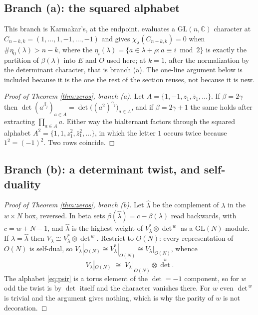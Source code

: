 \documentclass[11pt,reqno]{amsart}
\theoremstyle{plain}
\theoremstyle{definition}
\newcommand{\CC}{\mathbb{C}}
\begin{document}
\subsection{Branch (a): the squared alphabet}\label{sec:brancha}

This branch is Karmakar's, at the endpoint. \cite[Theorem 4.1(A)]{Kar24} evaluates a
$\mathrm{GL}(n,\CC)$ character at $C_{n-k,k}=(1,\dots,1,-1,\dots,-1)$ and gives
$\chi_\lambda(C_{n-k,k})=0$ when $\#\eta_0(\lambda)>n-k$, where the $\eta_i(\lambda)=\{a\in
\lambda+\rho: a\equiv i \bmod 2\}$ is exactly the partition of $\beta(\lambda)$ into $E$ and $O$ used
here; at $k=1$, after the normalization by the determinant character, that is branch (a). The
one-line argument below is included because it is the one the rest of the section reuses, not because
it is new.

\begin{proof}[Proof of Theorem \ref{thm:zeros}, branch {\rm(a)}]
Let $A=\{1,-1,z_1,\bar z_1,\dots\}$. If $\beta=2\gamma$ then
$\det(a^{\beta_j})_{a\in A}=\det\big((a^2)^{\gamma_j}\big)_{a\in A}$, and if $\beta=2\gamma+1$ the
same holds after extracting $\prod_{a\in A}a$. Either way the bialternant factors through the
squared alphabet $A^2=\{1,1,z_1^{2},\bar z_1^{2},\dots\}$, in which the letter $1$ occurs twice
because $1^2=(-1)^2$. Two rows coincide.
\end{proof}

\subsection{Branch (b): a determinant twist, and self-duality}

\begin{proof}[Proof of Theorem \ref{thm:zeros}, branch {\rm(b)}]
Let $\hat\lambda$ be the complement of $\lambda$ in the $w\times N$ box, reversed. In beta sets
$\beta(\hat\lambda)=c-\beta(\lambda)$ read backwards, with $c=w+N-1$, and $\hat\lambda$ is the
highest weight of $V_\lambda^{*}\otimes\det^{\,w}$ as a $\mathrm{GL}(N)$-module. If
$\lambda=\hat\lambda$ then $V_\lambda\cong V_\lambda^{*}\otimes\det^{\,w}$. Restrict to $O(N)$: every
representation of $O(N)$ is self-dual, so $V_\lambda|_{O(N)}\cong V_\lambda^{*}|_{O(N)}\cong
V_\lambda|_{O(N)}$, whence
\[
V_\lambda|_{O(N)}\;\cong\;V_\lambda|_{O(N)}\otimes\det^{\,w}.
\]
The alphabet \eqref{eq:psir} is a torus element of the $\det=-1$ component, so for $w$ odd the twist
is by $\det$ itself and the character vanishes there. For $w$ even $\det^{\,w}$ is trivial and the
argument gives nothing, which is why the parity of $w$ is not decoration.
\end{proof}
\end{document}
